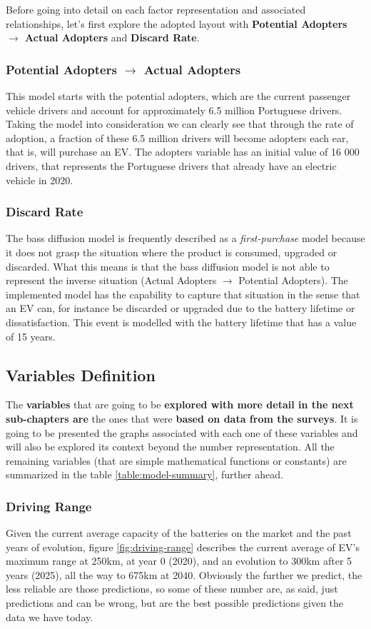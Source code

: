 \clearpage

Before going into detail on each factor representation and associated relationships, let's first explore the adopted layout with \textbf{Potential Adopters $\rightarrow$ Actual Adopters} and \textbf{Discard Rate}.

\subsubsection{Potential Adopters $\rightarrow$ Actual Adopters}
This model starts with the potential adopters, which are the current passenger vehicle drivers and account for approximately 6.5 million Portuguese drivers. Taking the model into consideration we can clearly see that through the rate of adoption, a fraction of these 6.5 million drivers will become adopters each ear, that is, will purchase an EV. The adopters variable has an initial value of 16 000 drivers, that represents the Portuguese drivers that already have an electric vehicle in 2020. 

\subsubsection{Discard Rate}
The bass diffusion model is frequently described as a \textit{first-purchase} model because it does not grasp the situation where the product is consumed, upgraded or discarded. What this means is that the bass diffusion model is not able to represent the inverse situation (Actual Adopters $\rightarrow$ Potential Adopters). The implemented model has the capability to capture that situation in the sense that an EV can, for instance be discarded or upgraded due to the battery lifetime or dissatisfaction. This event is modelled with the battery lifetime that has a value of 15 years. 

\subsection{Variables Definition}
The \textbf{variables} that are going to be \textbf{explored with more detail in the next sub-chapters are} the ones that were \textbf{based on data from the surveys}. It is going to be presented the graphs associated with each one of these variables and will also be explored its context beyond the number representation. All the remaining variables (that are simple mathematical functions or constants) are summarized in the table \ref{table:model-summary}, further ahead.

\subsubsection{Driving Range}
Given the current average capacity of the batteries on the market and the past years of evolution, figure \ref{fig:driving-range} describes the current average of EV's maximum range at 250km, at year 0 (2020), and an evolution to 300km after 5 years (2025), all the way to 675km at 2040. Obviously the further we predict, the less reliable are those predictions, so some of these number are, as said, just predictions and can be wrong, but are the best possible predictions given the data we have today.

